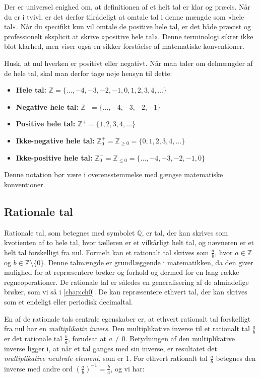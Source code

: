 Der er universel enighed om, at definitionen af et helt tal er klar og præcis. Når du er i tvivl, er det derfor tilrådeligt at omtale tal i denne mængde som »hele tal«. Når du specifikt kun vil omtale de positive hele tal, er det både præcist og professionelt eksplicit at skrive »positive hele tal«. Denne terminologi sikrer ikke blot klarhed, men viser også en sikker forståelse af matematiske konventioner. 

Husk, at nul hverken er positivt eller negativt. Når man taler om delmængder af de hele tal, skal man derfor tage nøje hensyn til dette:

\begin{itemize}
    \item \textbf{Hele tal:} $\mathbb{Z} = \{\ldots,-4,-3,-2,-1,0,1,2,3,4, \ldots\}$
    \item \textbf{Negative hele tal:} $\mathbb{Z}^- = \{\ldots,-4,-3,-2,-1\}$
    \item \textbf{Positive hele tal:} $\mathbb{Z}^+ = \{1,2,3,4, \ldots\}$
    \item \textbf{Ikke-negative hele tal:} $\mathbb{Z}_0^+ = \mathbb{Z}_{\geq 0} = \{0,1,2,3,4, \ldots\}$
    \item \textbf{Ikke-positive hele tal:} $\mathbb{Z}_0^- = \mathbb{Z}_{\leq 0} = \{\ldots,-4,-3,-2,-1, 0\}$
\end{itemize}

Denne notation bør være i overensstemmelse med gængse matematiske konventioner.

\subsection*{Rationale tal}
Rationale tal, som betegnes med symbolet $\mathbb{Q}$, er tal, der kan skrives som kvotienten af to hele tal, hvor tælleren er et vilkårligt helt tal, og nævneren er et helt tal forskelligt fra nul. Formelt kan et rationalt tal skrives som $\frac{a}{b}$, hvor $a \in \mathbb{Z}$ og $b \in \mathbb{Z} \setminus \{0\}$. Denne talmængde er grundlæggende i matematikken, da den giver mulighed for at repræsentere brøker og forhold og dermed for en lang række regneoperationer. De rationale tal er således en generalisering af de almindelige brøker, som vi så i \autoref{chap:ch0}. De kan repræsentere ethvert tal, der kan skrives som et endeligt eller periodisk decimaltal.

En af de rationale tals centrale egenskaber er, at ethvert rationalt tal forskelligt fra nul har en \textit{multiplikativ invers}. Den multiplikative inverse til et rationalt tal $\frac{a}{b}$ er det rationale tal $\frac{b}{a}$, forudsat at $a \neq 0$. Betydningen af den multiplikative inverse ligger i, at når et tal ganges med sin inverse, er resultatet det \textit{multiplikative neutrale element}, som er 1. For ethvert rationalt tal $\frac{a}{b}$ betegnes den inverse med andre ord $\left(\frac{a}{b}\right)^{-1} = \frac{b}{a}$, og vi har:

